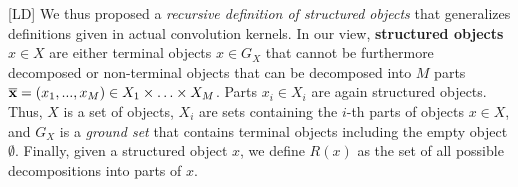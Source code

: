 \documentclass[twoside,11pt]{article}
\def\substr#1{{\bf\overline{#1}}}
\def\myinsert#1{#1}
\def\LD#1{[{\color{blue}L}D] {\color{blue}#1}}
\begin{document}
\LD{We thus proposed a \emph{recursive definition of structured objects} that generalizes definitions given in actual convolution kernels.} In our view, \textbf{structured objects} $x \in X$ are either terminal objects $x \in G_X$ that cannot be furthermore decomposed or non-terminal objects that can be decomposed into \myinsert{$M$} parts $\substr{x} = (x_1,...,x_M) \in X_1 \times \ldots \times X_M$. Parts $x_i \in X_i$ are again structured objects. 
Thus, $X$ is a set of objects, $X_i$ are sets containing the $i$-th parts of objects $x \in X$, and $G_X$ is a \emph{ground set} that contains terminal objects including the empty object $\emptyset$. 
Finally, given a structured object $x$, we define $R(x)$ as the set of all possible decompositions into parts of $x$.
\end{document}
